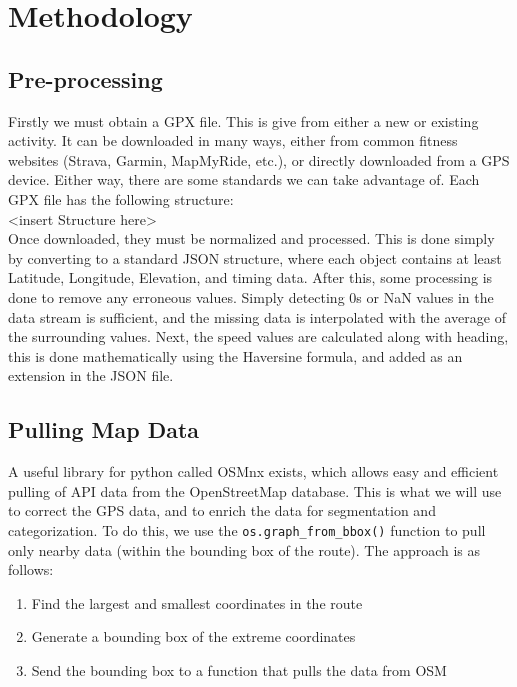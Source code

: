 \documentclass[12pt,a4paper]{report}
\begin{document}
\tableofcontents
\newpage
\section{Methodology}

\subsection{Pre-processing}
Firstly we must obtain a GPX file. This is give from either a new or existing activity. It can be downloaded in many ways, either from common fitness websites (Strava, Garmin, MapMyRide, etc.), or directly
downloaded from a GPS device. Either way, there are some standards we can take advantage of. Each GPX file has the following structure:
\\ <insert Structure here>
\\
Once downloaded, they must be normalized and processed. This is done simply by converting to a standard JSON structure, where each object contains at least Latitude, Longitude, Elevation, and timing data.
After this, some processing is done to remove any erroneous values. Simply detecting 0s or NaN values in the data stream is sufficient, and the missing data is interpolated with the average of the surrounding values.
Next, the speed values are calculated along with heading, this is done mathematically using the Haversine formula, and added as an extension in the JSON file.

\subsection{Pulling Map Data}
A useful library for python called OSMnx exists, which allows easy and efficient pulling of API data from the OpenStreetMap database. This is what we will use to correct the GPS data, and to enrich the data for segmentation and categorization.
To do this, we use the \texttt{os.graph\_from\_bbox()} function to pull only nearby data (within the bounding box of the route). The approach is as follows:
\begin{enumerate}
	\item Find the largest and smallest coordinates in the route
	\item Generate a bounding box of the extreme coordinates
	\item Send the bounding box to a function that pulls the data from OSM
\end{enumerate}
\end{document}
